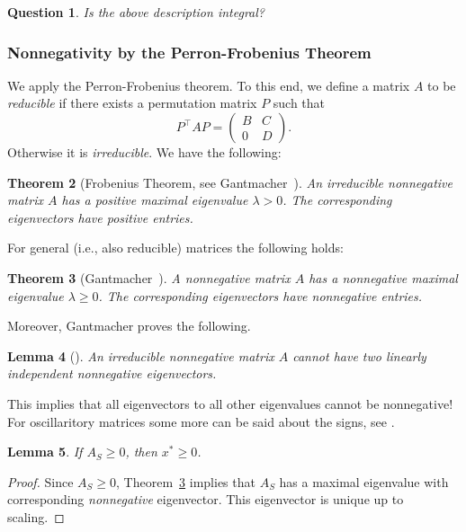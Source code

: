 \documentclass[10pt, a4paper]{article}
\newcommand{\T}{^{\top}}
\newtheorem{theorem}{Theorem}
\newtheorem{lemma}[theorem]{Lemma}
\newtheorem{question}[theorem]{Question}
\begin{document}
\begin{question}
  Is the above description integral?
\end{question}


\subsubsection{Nonnegativity by the Perron-Frobenius Theorem}

We apply the Perron-Frobenius theorem. To this end, we define a matrix $A$ to
be \emph{reducible} if there exists a permutation matrix $P$ such that
\[
  P\T A P = \begin{pmatrix} B & C \\ 0 & D \end{pmatrix}.
\]
Otherwise it is \emph{irreducible}. We have the following:

\begin{theorem}[{Frobenius Theorem, see Gantmacher~\cite[Chapter 2, Thm.~2]{Gan59II}}]\label{thm:PerronFrobenius}
  An irreducible nonnegative matrix $A$ has a positive maximal eigenvalue
  $\lambda > 0$. The corresponding eigenvectors have positive entries.
\end{theorem}

For general (i.e., also reducible) matrices the following holds:
\begin{theorem}[{Gantmacher~\cite[Chapter 2, Thm.~3]{Gan59II}}]\label{thm:PerronFrobeniusNonnegative}
  A nonnegative matrix $A$ has a nonnegative maximal eigenvalue
  $\lambda \geq 0$. The corresponding eigenvectors have nonnegative
  entries.
\end{theorem}

Moreover, Gantmacher proves the following.
\begin{lemma}[{\cite[Chapter 2, Remark 3]{Gan59II}}]\label{lemma:PFNegative}
  An irreducible nonnegative matrix $A$ cannot have two linearly
  independent nonnegative eigenvectors.
\end{lemma}
This implies that all eigenvectors to all other eigenvalues cannot be nonnegative!
For oscillaritory matrices some more can be said about the signs, see
\cite[Chapter 2, Theorem~13]{Gan59II}.

\begin{lemma}
  If $A_S \geq 0$, then $x^* \geq 0$.
\end{lemma}

\begin{proof}
  Since $A_S \geq 0$, Theorem~\ref{thm:PerronFrobeniusNonnegative} implies
  that $A_S$ has a maximal eigenvalue with corresponding \emph{nonnegative}
  eigenvector. This eigenvector is unique up to scaling.
\end{proof}
\end{document}
